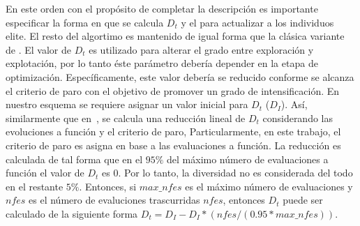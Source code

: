 En este orden con el propósito de completar la descripción es importante especificar la forma en que se calcula $D_t$ y el para actualizar a los individuos elite.
%
El resto del algortimo es mantenido de igual forma que la clásica variante de \DE{}.
%
El valor de $D_t$ es utilizado para alterar el grado entre exploración y explotación, por lo tanto éste parámetro debería depender en la etapa de optimización.
%
Específicamente, este valor debería se reducido conforme se alcanza el criterio de paro con el objetivo de promover un grado de intensificación.
%
En nuestro esquema se requiere asignar un valor inicial para $D_t$ ($D_I$).
%
Así, similarmente que en~\cite{segura2016novel}, se calcula una reducción lineal de $D_t$ considerando las evoluciones a función y el criterio de paro, 
%
Particularmente, en este trabajo, el criterio de paro es asigna en base a las evaluaciones a función.
%
La reducción es calculada de tal forma que en el $95\%$ del máximo número de evaluaciones a función el valor de $D_t$ es $0$.
%
Por lo tanto, la diversidad no es considerada del todo en el restante $5\%$.
%
Entonces, si $max\_nfes$ es el máximo número de evaluaciones y $nfes$ es el número de evaluciones trascurridas $nfes$, entonces $D_t$ puede ser calculado de la siguiente forma $D_t=D_I - D_I *(nfes/(0.95*max\_nfes))$.
%

